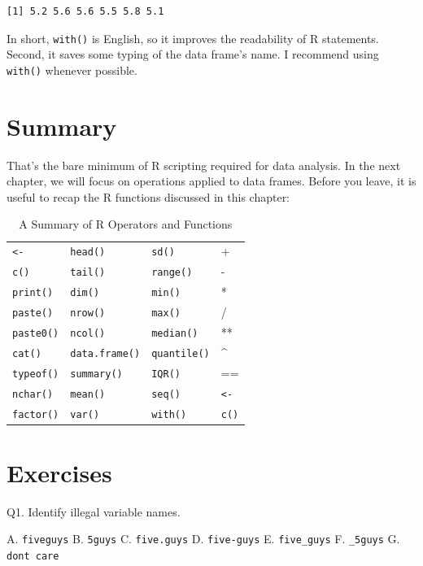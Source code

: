 \documentclass[
  letterpaper,
  DIV=11,
  numbers=noendperiod]{scrreprt}
\begin{document}
\begin{verbatim}
[1] 5.2 5.6 5.6 5.5 5.8 5.1
\end{verbatim}

In short, \texttt{with()} is English, so it improves the readability of
R statements. Second, it saves some typing of the data frame's name. I
recommend using \texttt{with()} whenever possible.

\section{Summary}\label{summary}

That's the bare minimum of R scripting required for data analysis. In
the next chapter, we will focus on operations applied to data frames.
Before you leave, it is useful to recap the R functions discussed in
this chapter:

\begin{longtable}[]{@{}llll@{}}
\caption{A Summary of R Operators and Functions}\tabularnewline
\toprule\noalign{}
\endfirsthead
\endhead
\bottomrule\noalign{}
\endlastfoot
\texttt{\textless{}-} & \texttt{head()} & \texttt{sd()} & + \\
\texttt{c()} & \texttt{tail()} & \texttt{range()} & - \\
\texttt{print()} & \texttt{dim()} & \texttt{min()} & * \\
\texttt{paste()} & \texttt{nrow()} & \texttt{max()} & / \\
\texttt{paste0()} & \texttt{ncol()} & \texttt{median()} & ** \\
\texttt{cat()} & \texttt{data.frame()} & \texttt{quantile()} & \^{} \\
\texttt{typeof()} & \texttt{summary()} & \texttt{IQR()} & == \\
\texttt{nchar()} & \texttt{mean()} & \texttt{seq()} &
\texttt{\textless{}-} \\
\texttt{factor()} & \texttt{var()} & \texttt{with()} & \texttt{c()} \\
\end{longtable}

\section{Exercises}\label{sec-01-exercises}

Q1. Identify illegal variable names.

A. \texttt{fiveguys} B. \texttt{5guys} C. \texttt{five.guys} D.
\texttt{five-guys} E. \texttt{five\_guys} F. \texttt{\_5guys} G.
\texttt{don\textquotesingle{}t\ care}
\end{document}
